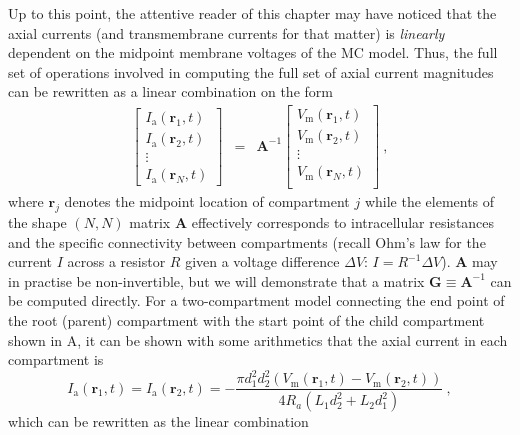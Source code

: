 Up to this point, the attentive reader of this chapter may have noticed that the axial currents (and transmembrane currents for that matter) is \textit{linearly} dependent on the midpoint membrane voltages of the MC model.
Thus, the full set of operations involved in computing the full set of axial current magnitudes can be rewritten as a linear combination on the form
%
\begin{eqnarray}
\begin{bmatrix}
I_\text{a}(\mathbf{r}_1, t)\\
I_\text{a}(\mathbf{r}_2, t)\\
\vdots \\
I_\text{a}(\mathbf{r}_N, t)
\end{bmatrix}
&=& \mathbf{A}^{-1}
\begin{bmatrix}
V_\text{m}(\mathbf{r}_1, t)\\
V_\text{m}(\mathbf{r}_2, t)\\
\vdots \\
V_\text{m}(\mathbf{r}_N, t)\\
\end{bmatrix} ~,
\label{eq:LFPy_linear_combination}
\end{eqnarray}
%
where $\mathbf{r}_j$ denotes the midpoint location of compartment $j$ while the elements of the shape $(N, N)$ matrix $\mathbf{A}$ effectively corresponds to intracellular resistances and the specific connectivity between compartments
(recall Ohm's law for the current $I$ across a resistor $R$ given a voltage difference $\Delta V$: $I=R^{-1} \Delta V$).
$\mathbf{A}$ may in practise be non-invertible,
but we will demonstrate that a matrix $\mathbf{G}\equiv \mathbf{A}^{-1}$ can be computed directly.
%
For a two-compartment model connecting the end point of the root (parent) compartment with the start point of the child compartment shown in A,
it can be shown with some arithmetics that the axial current in each compartment is 
%
\begin{equation}
I_\text{a}(\mathbf{r}_1, t) = I_\text{a}(\mathbf{r}_2, t) =
	- \frac{\pi d_{1}^{2} d_{2}^{2} \left(V_\text{m}(\mathbf{r}_1, t) - V_\text{m}(\mathbf{r}_2, t) \right)}{4 R_{a} \left(L_{1} d_{2}^{2} + L_{2} d_{1}^{2}\right)} ~,
\end{equation}
%
which can be rewritten as the linear combination
